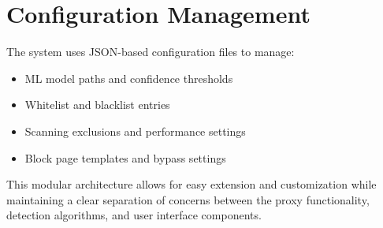 \section{Configuration Management}

The system uses JSON-based configuration files to manage:

\begin{itemize}
    \item ML model paths and confidence thresholds
    \item Whitelist and blacklist entries
    \item Scanning exclusions and performance settings
    \item Block page templates and bypass settings
\end{itemize}

This modular architecture allows for easy extension and customization while maintaining a clear separation of concerns between the proxy functionality, detection algorithms, and user interface components.
